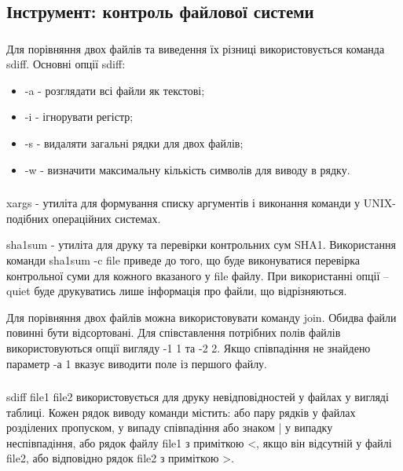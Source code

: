 \documentclass[t]{beamer}  %
\begin{document}
\subsection{Інструмент: контроль файлової системи}

\begin{frame}
 	\frametitle{\insertsection} 
 	\framesubtitle{\insertsubsection}
Для порівняння двох файлів та виведення їх різниці використовується команда sdiff. Основні опції sdiff:
\begin{itemize}
   	  \item -a - розглядати всі файли як текстові;
   	  \item -i - ігнорувати регістр;
   	  \item -s - видаляти загальні рядки для двох файлів;
   	  \item -w - визначити максимальну кількість символів для виводу в рядку.
\end{itemize}   	

 \end{frame}

\begin{frame}
 	\frametitle{\insertsection} 
 	\framesubtitle{\insertsubsection}
xargs - утиліта для формування списку аргументів і виконання команди у UNIX-подібних операційних системах.

sha1sum - утиліта для друку та перевірки контрольних сум SHA1. Використання команди sha1sum -c file приведе до того, що буде виконуватися перевірка контрольної суми для кожного вказаного у file файлу. При використанні опції --quiet буде друкуватись лише інформація про файли, що відрізняються.    

Для порівняння двох файлів можна використовувати команду join. Обидва файли повинні бути відсортовані. Для співставлення потрібних полів файлів використовуються опції вигляду -1 1 та -2 2. Якщо співпадіння не знайдено параметр -а 1 вказує виводити поле із першого файлу.  

 \end{frame}
 
 \begin{frame}
 	\frametitle{\insertsection} 
 	\framesubtitle{\insertsubsection}
sdiff file1 file2 використовується для друку невідповідностей у файлах у вигляді таблиці. Кожен рядок виводу команди містить: або пару рядків у файлах розділених пропуском, у випаду співпадіння або знаком | у випадку неспівпадіння, або рядок файлу file1 з приміткою <, якщо він відсутній у файлі file2, або відповідно рядок file2 з приміткою >. 
 \end{frame}
\end{document}
